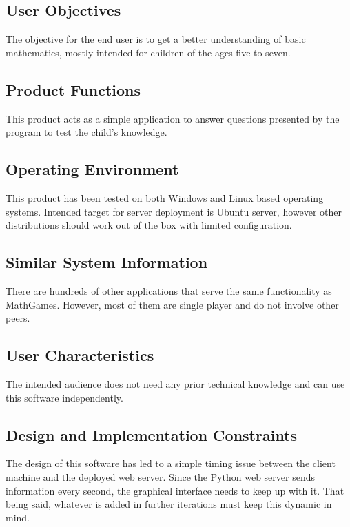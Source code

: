 \documentclass[12pt]{article}
\begin{document}
\subsection{User Objectives}

The objective for the end user is to get a better understanding of basic mathematics, mostly intended for children of the ages five to seven.

\subsection{Product Functions}

This product acts as a simple application to answer questions presented by the program to test the child's knowledge.

\subsection{Operating Environment}

\label{marker}

This product has been tested on both Windows and Linux based operating systems.
Intended target for server deployment is Ubuntu server, however other distributions should work out of the box with limited configuration.

\subsection{Similar System Information}

There are hundreds of other applications that serve the same functionality as MathGames.
However, most of them are single player and do not involve other peers.

\subsection{User Characteristics}

The intended audience does not need any prior technical knowledge and can use this software independently.

\subsection{Design and Implementation Constraints}
The design of this software has led to a simple timing issue between the client machine and the deployed web server. 
Since the Python web server sends information every second, the graphical interface needs to keep up with it. 
That being said, whatever is added in further iterations must keep this dynamic in mind.
\end{document}

